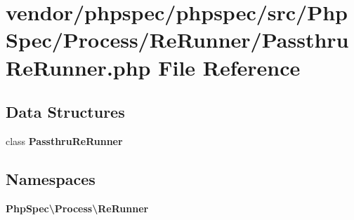 \section{vendor/phpspec/phpspec/src/\+Php\+Spec/\+Process/\+Re\+Runner/\+Passthru\+Re\+Runner.php File Reference}
\label{_passthru_re_runner_8php}
\subsection*{Data Structures}
\begin{DoxyCompactItemize}
\item 
class {\bf Passthru\+Re\+Runner}
\end{DoxyCompactItemize}
\subsection*{Namespaces}
\begin{DoxyCompactItemize}
\item 
 {\bf Php\+Spec\textbackslash{}\+Process\textbackslash{}\+Re\+Runner}
\end{DoxyCompactItemize}
